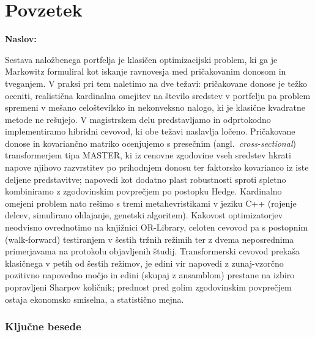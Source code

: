 \chapter*{Povzetek}

\noindent\textbf{Naslov:} \ttitle
\bigskip

Sestava naložbenega portfelja je klasičen optimizacijski problem, ki ga je Markowitz formuliral kot iskanje ravnovesja med pričakovanim donosom in tveganjem. V praksi pri tem naletimo na dve težavi: pričakovane donose je težko oceniti, realistična kardinalna omejitev na število sredstev v portfelju pa problem spremeni v mešano celoštevilsko in nekonveksno nalogo, ki je klasične kvadratne metode ne rešujejo. V magistrskem delu predstavljamo in odprtokodno implementiramo hibridni cevovod, ki obe težavi naslavlja ločeno. Pričakovane donose in kovariančno matriko ocenjujemo s presečnim (angl.\ \emph{cross-sectional}) transformerjem tipa MASTER, ki iz cenovne zgodovine vseh sredstev hkrati napove njihovo razvrstitev po prihodnjem donosu ter faktorsko kovarianco iz iste deljene predstavitve; napovedi kot dodatno plast robustnosti sproti spletno kombiniramo z zgodovinskim povprečjem po postopku Hedge. Kardinalno omejeni problem nato rešimo s tremi metahevristikami v jeziku C++ (rojenje delcev, simulirano ohlajanje, genetski algoritem). Kakovost optimizatorjev neodvisno ovrednotimo na knjižnici OR-Library, celoten cevovod pa s postopnim (walk-forward) testiranjem v šestih tržnih režimih ter z dvema neposrednima primerjavama na protokolu objavljenih študij. Transformerski cevovod prekaša klasičnega v petih od šestih režimov, je edini vir napovedi z zunaj-vzorčno pozitivno napovedno močjo in edini (skupaj z ansamblom) prestane na izbiro popravljeni Sharpov količnik; prednost pred golim zgodovinskim povprečjem ostaja ekonomsko smiselna, a statistično mejna.

\subsection*{Ključne besede}
\textit{\tkeywords}
\clearemptydoublepage